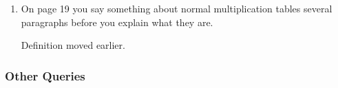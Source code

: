 \documentclass[12pt,a4paper]{article}
\newenvironment{QandA}{\begin{enumerate}[label=\bfseries\alph*.]\bfseries}
                      {\end{enumerate}}
\newenvironment{answered}{\par\normalfont}{}
\begin{document}
\begin{QandA}
\begin{answered}
The section from the end of the proof of Theorem 5.8 to the end of the proof of Theorem 5.9 has been rewritten to account for this.
\end{answered}

\item
On page 19 you say something about normal multiplication tables several paragraphs before you explain what they are.

\begin{answered}
Definition moved earlier.
\end{answered}

\end{QandA}

\subsubsection*{Other Queries}
\end{document}
